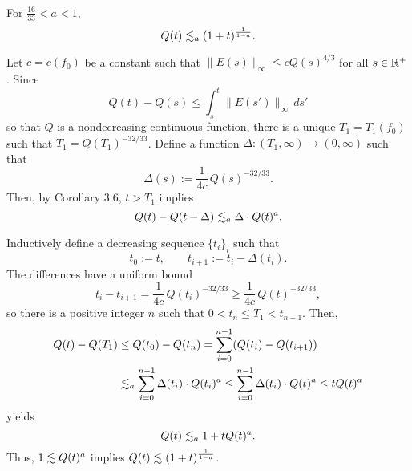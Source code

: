 \documentclass[11pt]{amsart}
\begin{document}
\begin{thm*}
For $\frac{16}{33}<a<1$,
\[Q(t)\lesssim_a(1+t)^{\frac1{1-a}}.\]
\end{thm*}

\begin{pf}
Let $c=c(f_0)$ be a constant such that
$\|E(s)\|_\infty\le cQ(s)^{4/3}$
for all $s\in\mathbb{R}^+$.
Since
\[Q(t)-Q(s)\le\int_s^t\|E(s')\|_\infty\,ds'\]
so that $Q$ is a nondecreasing continuous function, there is a unique $T_1=T_1(f_0)$ such that $T_1=Q(T_1)^{-32/33}$.
Define a function $\Delta:(T_1,\infty)\to(0,\infty)$ such that
\[\Delta(s):=\frac1{4c}\,Q(s)^{-32/33}.\]
Then, by Corollary 3.6, $t>T_1$ implies
\[Q(t)-Q(t-\Delta)\lesssim_a\Delta\cdot Q(t)^a.\]

Inductively define a decreasing sequence $\{t_i\}_i$ such that
\[t_0:=t,\qquad t_{i+1}:=t_i-\Delta(t_i).\]
The differences have a uniform bound
\[t_i-t_{i+1}=\frac1{4c}\,Q(t_i)^{-32/33}\ge\frac1{4c}\,Q(t)^{-32/33},\]
so there is a positive integer $n$ such that $0<t_n\le T_1<t_{n-1}$.
Then,
\begin{align*}
Q(t)-Q(T_1)&\le Q(t_0)-Q(t_n)
=\sum_{i=0}^{n-1}(Q(t_i)-Q(t_{i+1}))\\
&\lesssim_a\sum_{i=0}^{n-1}\Delta(t_i)\cdot Q(t_i)^a
\le\sum_{i=0}^{n-1}\Delta(t_i)\cdot Q(t)^a
\le tQ(t)^a
\end{align*}
yields
\[Q(t)\lesssim_a1+tQ(t)^a.\]
Thus, $1\lesssim Q(t)^a$ implies $Q(t)\lesssim(1+t)^{\frac1{1-a}}$.
\end{pf}




\end{document}
